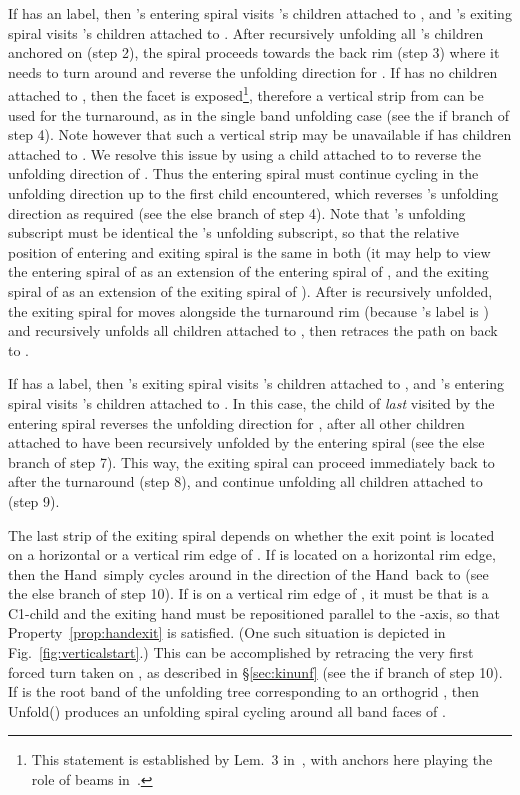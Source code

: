 \documentclass[11pt]{article}
\newcommand\hand{{\sc Hand}}
\newcommand\unfoldrims{{\sc Unfold}}
\begin{document}
If  has an  label, then 's entering spiral visits 's children attached to , and 's exiting spiral visits 's children attached to . After recursively unfolding all 's children anchored on  (step 2), the spiral proceeds towards the back rim  (step 3) where it needs to turn around and reverse the unfolding direction for . If  has no children attached to , then the facet  is exposed\footnote{This statement is established by Lem.~3 in~\cite{Damian-Flatland-O'Rourke-2007-epsilon}, with anchors here playing the role of beams in~\cite{Damian-Flatland-O'Rourke-2007-epsilon}.}, therefore a vertical strip from  can be used for the turnaround, as in the single band unfolding case (see the if branch of step 4). Note however that such a vertical strip may be unavailable if  has children attached to . We resolve this issue by using a child  attached to  to reverse the unfolding direction of . Thus the entering spiral must continue cycling in the unfolding direction up to the first child encountered, which reverses 's unfolding direction as required (see the else branch of step 4). Note that 's unfolding subscript must be identical the 's unfolding subscript, so that the relative position of entering and exiting spiral is the same in both (it may help to view the entering spiral of  as an extension of the entering spiral of , and the exiting spiral of  as an extension of the exiting spiral of ). After  is recursively unfolded, the exiting spiral for  moves alongside the turnaround rim  (because 's label is  ) and recursively unfolds all children attached to ,  then retraces the path on  back to .

If  has a  label, then 's exiting spiral visits 's children attached to , and 's entering spiral visits 's children attached to . In this case, the child  of  \emph{last} visited by the entering spiral reverses the unfolding direction for , after all other children attached to  have been recursively unfolded by the entering spiral (see the else branch of step 7). This way, the exiting spiral can proceed immediately back to  after the turnaround (step 8), and continue unfolding all children attached to  (step 9). 

The last strip of the exiting spiral depends on whether the exit point  is located on a horizontal or a vertical rim edge of . If  is located on a horizontal rim edge, then the \hand\ simply cycles around in the direction of the \hand\ back to  (see the else branch of step 10). If  is on a vertical rim edge of , it must be that  is a C1-child and the exiting hand must be repositioned parallel to the -axis, so that Property~\ref{prop:handexit} is satisfied.  (One such situation is depicted in Fig.~\ref{fig:verticalstart}.) This can be accomplished by retracing the very first forced turn taken on , as described in \S\ref{sec:kinunf} (see the if branch of step 10). 
If  is the root band of the unfolding tree  corresponding to an orthogrid , then \unfoldrims() produces an unfolding spiral  cycling around all band faces of . 
\end{document}
